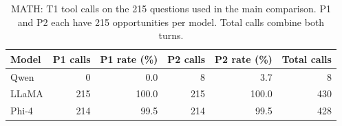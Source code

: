 \begin{table}[!ht]
\centering
\small
\caption{MATH: T1 tool calls on the 215 questions used
in the main comparison. P1 and P2 each have 215 opportunities
per model. Total calls combine both turns.}
\label{tab:math-tool-calls}

\begin{tabular}{@{}lrrrrr@{}}
\toprule
Model & P1 calls & P1 rate (\%)
      & P2 calls & P2 rate (\%) & Total calls \\
\midrule
Qwen  & 0   & 0.0   & 8   & 3.7   & 8   \\
LLaMA & 215 & 100.0 & 215 & 100.0 & 430 \\
Phi-4 & 214 & 99.5  & 214 & 99.5  & 428 \\
\bottomrule
\end{tabular}
\end{table}
